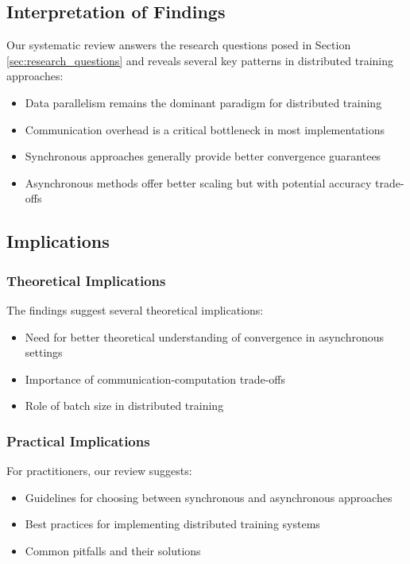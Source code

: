 \subsection{Interpretation of Findings}
Our systematic review answers the research questions posed in Section \ref{sec:research_questions} and reveals several key patterns in distributed training approaches:
\begin{itemize}
    \item Data parallelism remains the dominant paradigm for distributed training
    \item Communication overhead is a critical bottleneck in most implementations
    \item Synchronous approaches generally provide better convergence guarantees
    \item Asynchronous methods offer better scaling but with potential accuracy trade-offs
\end{itemize}

\subsection{Implications}
\subsubsection{Theoretical Implications}
The findings suggest several theoretical implications:
\begin{itemize}
    \item Need for better theoretical understanding of convergence in asynchronous settings
    \item Importance of communication-computation trade-offs
    \item Role of batch size in distributed training
\end{itemize}

\subsubsection{Practical Implications}
For practitioners, our review suggests:
\begin{itemize}
    \item Guidelines for choosing between synchronous and asynchronous approaches
    \item Best practices for implementing distributed training systems
    \item Common pitfalls and their solutions
\end{itemize}

